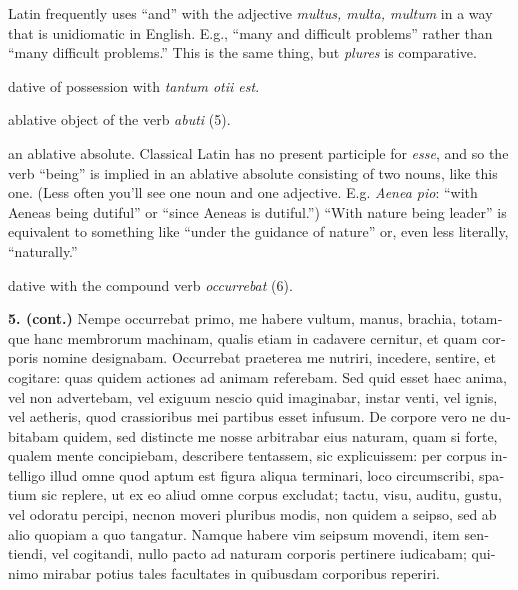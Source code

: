  Latin frequently uses ``and'' with the adjective \textit{multus, multa, multum} in a way that is unidiomatic in English. E.g., ``many and difficult problems'' rather than ``many difficult problems.'' This is the same thing, but \textit{plures} is comparative.

 dative of possession with \textit{tantum otii est}.

 ablative object of the verb \textit{abuti} (5).

 an ablative absolute. Classical Latin has no present participle for \textit{esse}, and so the verb ``being'' is implied in an ablative absolute consisting of two nouns, like this one. (Less often you'll see one noun and one adjective. E.g. \textit{Aenea pio}: ``with Aeneas being dutiful'' or ``since Aeneas is dutiful.'') ``With nature being leader'' is equivalent to something like ``under the guidance of nature'' or, even less literally, ``naturally.''

 dative with the compound verb \textit{occurrebat} (6).

\clearpage

\beginnumbering
\pstart
{}
\begin{latin}
    \textenglish{\textbf{5. (cont.)}} Nempe occurrebat primo, me habere vultum, manus, brachia, totamque hanc membrorum machinam, qualis etiam in cadavere cernitur, et quam corporis nomine designabam. Occurrebat praeterea me nutriri, incedere, sentire, et cogitare: quas quidem actiones ad animam referebam. Sed quid esset haec anima, vel non advertebam, vel exiguum nescio quid imaginabar, instar venti, vel ignis, vel aetheris, quod crassioribus mei partibus esset infusum. De corpore vero ne dubitabam quidem, sed distincte me nosse arbitrabar eius naturam, quam si forte, qualem mente concipiebam, describere tentassem, sic explicuissem: per corpus intelligo illud omne quod aptum est figura aliqua terminari, loco circumscribi, spatium sic replere, ut ex eo aliud omne corpus excludat; tactu, visu, auditu, gustu, vel odoratu percipi, necnon moveri pluribus modis, non quidem a seipso, sed ab alio quopiam a quo tangatur. Namque habere vim seipsum movendi, item sentiendi, vel cogitandi, nullo pacto ad naturam corporis pertinere iudicabam; quinimo mirabar potius tales facultates in quibusdam corporibus reperiri.
\end{latin}
\pend
\endnumbering

